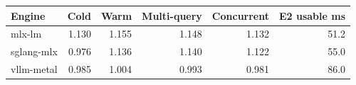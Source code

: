 \begin{tabular}{lrrrrr}
\toprule
Engine & Cold & Warm & Multi-query & Concurrent & E2 usable ms \\
\midrule
mlx-lm & 1.130 & 1.155 & 1.148 & 1.132 & 51.2 \\
sglang-mlx & 0.976 & 1.136 & 1.140 & 1.122 & 55.0 \\
vllm-metal & 0.985 & 1.004 & 0.993 & 0.981 & 86.0 \\
\bottomrule
\end{tabular}

